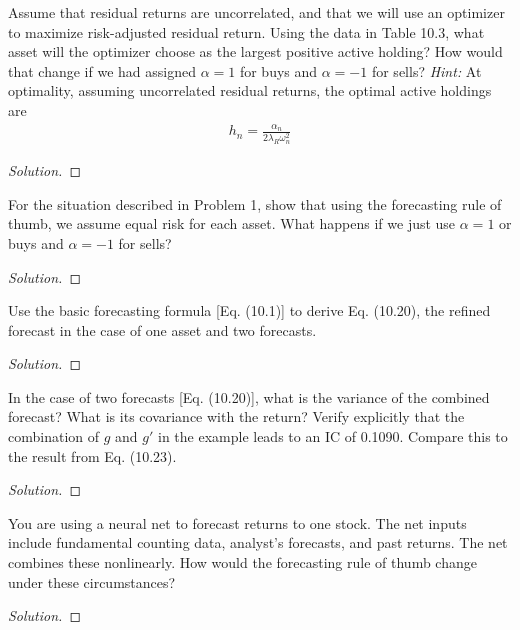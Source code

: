 \begin{problem}{10.1}
  Assume that residual returns are uncorrelated, and that we will use an optimizer to maximize risk-adjusted residual return. Using the data in Table 10.3, what asset will the optimizer choose as the largest positive active holding? How would that change if we had assigned $\alpha=1$ for buys and $\alpha=-1$ for sells? \textit{Hint:} At optimality, assuming uncorrelated residual returns, the optimal active holdings are
  \begin{align*}
   h_{n} = \frac{\alpha_{n}}{2\lambda_{R}\omega_{n}^{2}}
  \end{align*}

\end{problem}

\begin{proof}[Solution]
\end{proof}

\begin{problem}{10.2}
  For the situation described in Problem 1, show that using the forecasting rule of thumb, we assume equal risk for each asset. What happens if we just use $\alpha=1$ or buys and $\alpha=-1$ for sells?
\end{problem}

\begin{proof}[Solution]
\end{proof}


\begin{problem}{10.3}
  Use the basic forecasting formula [Eq. (10.1)] to derive Eq. (10.20), the refined forecast in the case of one asset and two forecasts.
\end{problem}

\begin{proof}[Solution]
\end{proof}


\begin{problem}{10.4}
  In the case of two forecasts [Eq. (10.20)], what is the variance of the combined forecast? What is its covariance with the return? Verify explicitly that the combination of $g$ and $g'$ in the example leads to an IC of 0.1090. Compare this to the result from Eq. (10.23).
\end{problem}

\begin{proof}[Solution]
\end{proof}


\begin{problem}{10.5}
  You are using a neural net to forecast returns to one stock. The net inputs include fundamental counting data, analyst's forecasts, and past returns. The net combines these nonlinearly. How would the forecasting rule of thumb change under these circumstances?
\end{problem}

\begin{proof}[Solution]
\end{proof}

